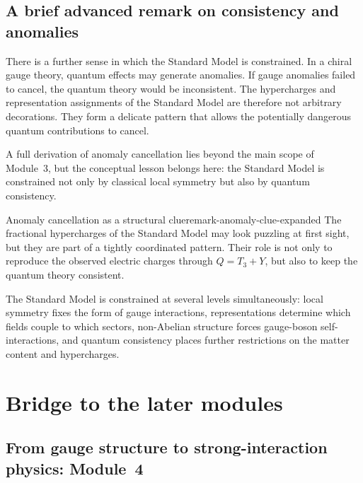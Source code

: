 \documentclass[11pt,a4paper]{article}
\begin{document}
\subsection{A brief advanced remark on consistency and anomalies}

There is a further sense in which the Standard Model is constrained. In a chiral gauge theory, quantum effects may generate anomalies. If gauge anomalies failed to cancel, the quantum theory would be inconsistent. The hypercharges and representation assignments of the Standard Model are therefore not arbitrary decorations. They form a delicate pattern that allows the potentially dangerous quantum contributions to cancel.

A full derivation of anomaly cancellation lies beyond the main scope of Module~3, but the conceptual lesson belongs here: the Standard Model is constrained not only by classical local symmetry but also by quantum consistency.



\begin{remarkbox}{Anomaly cancellation as a structural clue}{remark-anomaly-clue-expanded}
The fractional hypercharges of the Standard Model may look puzzling at first sight, but they are part of a tightly coordinated pattern. Their role is not only to reproduce the observed electric charges through \(Q=T_3+Y\), but also to keep the quantum theory consistent.
\end{remarkbox}



\begin{takehomebox}
\vspace{0.25cm}
The Standard Model is constrained at several levels simultaneously: local symmetry fixes the form of gauge interactions, representations determine which fields couple to which sectors, non-Abelian structure forces gauge-boson self-interactions, and quantum consistency places further restrictions on the matter content and hypercharges.
\end{takehomebox}




\section{Bridge to the later modules}

\subsection{From gauge structure to strong-interaction physics: Module~4}
\end{document}
